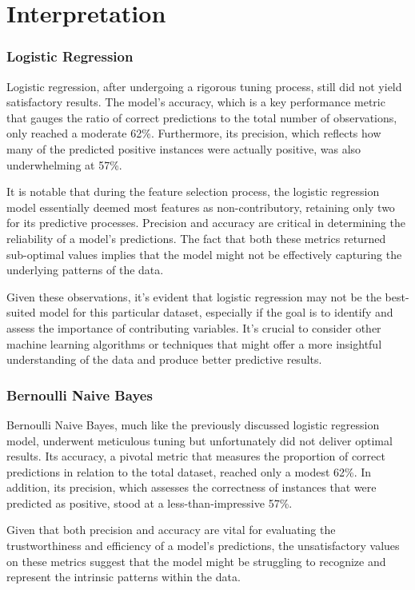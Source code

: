 \part{Interpretation}


    \section{Logistic Regression}

        Logistic regression, after undergoing a rigorous tuning process, still did not yield satisfactory results. The model's accuracy, which is a key performance metric that gauges the ratio of correct predictions to the total number of observations, only reached a moderate 62\%. Furthermore, its precision, which reflects how many of the predicted positive instances were actually positive, was also underwhelming at 57\%.

        It is notable that during the feature selection process, the logistic regression model essentially deemed most features as non-contributory, retaining only two for its predictive processes. Precision and accuracy are critical in determining the reliability of a model's predictions. The fact that both these metrics returned sub-optimal values implies that the model might not be effectively capturing the underlying patterns of the data.

        Given these observations, it's evident that logistic regression may not be the best-suited model for this particular dataset, especially if the goal is to identify and assess the importance of contributing variables. It's crucial to consider other machine learning algorithms or techniques that might offer a more insightful understanding of the data and produce better predictive results.


    \section{Bernoulli Naive Bayes}

        Bernoulli Naive Bayes, much like the previously discussed logistic regression model, underwent meticulous tuning but unfortunately did not deliver optimal results. Its accuracy, a pivotal metric that measures the proportion of correct predictions in relation to the total dataset, reached only a modest 62\%. In addition, its precision, which assesses the correctness of instances that were predicted as positive, stood at a less-than-impressive 57\%.

        Given that both precision and accuracy are vital for evaluating the trustworthiness and efficiency of a model's predictions, the unsatisfactory values on these metrics suggest that the model might be struggling to recognize and represent the intrinsic patterns within the data.

